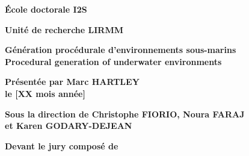 \begin{titlepage}
{		\bigskip
		\textbf{École doctorale I2S}
		
		\bigskip
		\textbf{Unité de recherche LIRMM}
		
		
		\color{Titleblue}
		\fontsize{17}{20.4}\selectfont
		\vspace{2cm}
		\textbf{Génération procédurale d'environnements sous-marins\\Procedural generation of underwater environments}
		
		
		\vspace{4cm}
		\fontsize{15}{18}\selectfont
		\color{black}
		\textbf{Présentée par Marc HARTLEY \\
			le [XX mois année]}
		
		\bigskip
		\fontsize{13}{15.6}\selectfont
		\textbf{Sous la direction de Christophe FIORIO, 
			Noura FARAJ \\
			et Karen GODARY-DEJEAN}
		
		\vspace{1.5cm}
		\normalsize
		\textbf{Devant le jury composé de}\\
		\bigskip
		\fontsize{10}{12}\selectfont
		\vspace{1.5mm}
		\begin{tabularx}{\textwidth}{l X r}


\end{tabularx}}
\end{titlepage}
